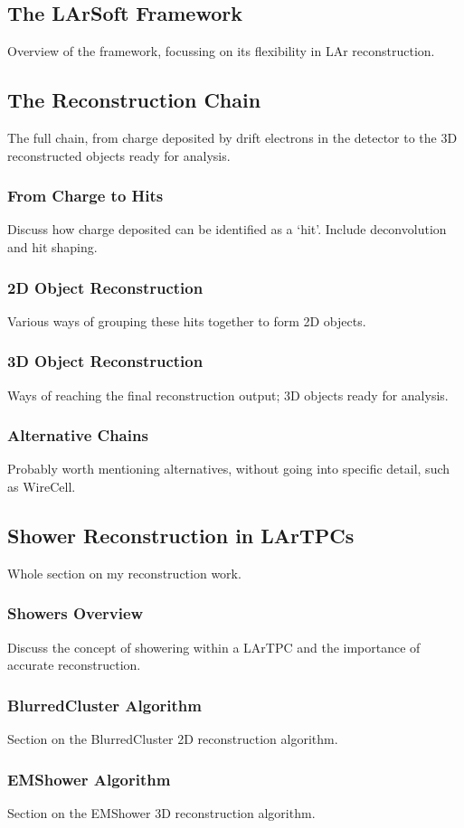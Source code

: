\documentclass[a4paper,12pt]{report}
\begin{document}
\subsection{The LArSoft Framework}
Overview of the framework, focussing on its flexibility in LAr reconstruction.
\subsection{The Reconstruction Chain}
The full chain, from charge deposited by drift electrons in the detector to the 3D reconstructed objects ready for analysis.
\subsubsection{From Charge to Hits}
Discuss how charge deposited can be identified as a `hit'. Include deconvolution and hit shaping.
\subsubsection{2D Object Reconstruction}
Various ways of grouping these hits together to form 2D objects.
\subsubsection{3D Object Reconstruction}
Ways of reaching the final reconstruction output; 3D objects ready for analysis.
\subsubsection{Alternative Chains}
Probably worth mentioning alternatives, without going into specific detail, such as WireCell.
\subsection{Shower Reconstruction in LArTPCs}
Whole section on my reconstruction work.
\subsubsection{Showers Overview}
Discuss the concept of showering within a LArTPC and the importance of accurate reconstruction.
\subsubsection{BlurredCluster Algorithm}
Section on the BlurredCluster 2D reconstruction algorithm.
\subsubsection{EMShower Algorithm}
Section on the EMShower 3D reconstruction algorithm.
\end{document}
